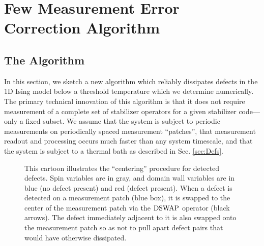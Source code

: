 \documentclass[twocolumn,superscriptaddress,aps,prb,floatfix]{revtex4-1}
\begin{document}
 
\section{Few Measurement Error Correction Algorithm}
\label{sec:ecc_alg}

\subsection{The Algorithm}

In this section, we sketch a new algorithm which reliably dissipates defects in the 1D Ising model below a threshold temperature which we determine numerically.  The primary technical innovation of this algorithm is that it does not require measurement of a complete set of stabilizer operators for a given stabilizer code---only a fixed subset.  We assume that the system is subject to periodic measurements on periodically spaced measurement ``patches'', that measurement readout and processing occurs much faster than any system timescale, and that the system is subject to a thermal bath as described in Sec. \ref{sec:Defs}.

\begin{figure}
\begin{center}
\end{center}
\caption{This cartoon illustrates the ``centering'' procedure for detected defects.  Spin variables are in gray, and domain wall variables are in blue (no defect present) and red (defect present).  When a defect is detected on a measurement patch (blue box), it is swapped to the center of the measurement patch via the $\rm{DSWAP}$ operator (black arrows).  The defect immediately adjacent to it is also swapped onto the measurement patch so as not to pull apart defect pairs that would have otherwise dissipated.}
\label{fig:detect_swap}
\end{figure}
\end{document}
